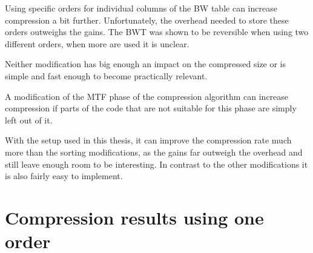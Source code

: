 \documentclass[a4paper]{scrreprt}
\begin{document}
Using specific orders for individual columns of the BW table can increase
compression a bit further. Unfortunately, the overhead needed to store these
orders outweighs the gains. The BWT was shown to be reversible when using two
different orders, when more are used it is unclear. 

Neither modification has big enough an impact on the compressed size or is
simple and fast enough to become practically relevant.

A modification of the MTF phase of the compression algorithm can increase
compression if parts of the code that are not suitable for this phase are simply
left out of it.

With the setup used in this thesis, it can improve the compression rate much
more than the sorting modifications, as the gains far outweigh the overhead and
still leave enough room to be interesting. In contrast to the other
modifications it is also fairly easy to implement.

\appendix

\chapter{Compression results using one order}
\label{app:resultsoneorder}
\end{document}
